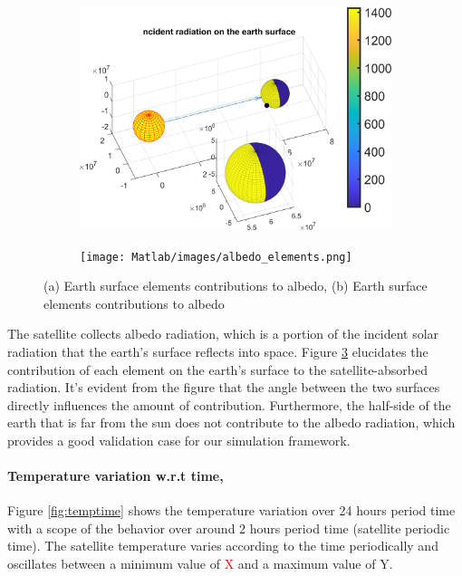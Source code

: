 \documentclass[11pt]{article}
\begin{document}
 
\begin{figure}[h]
    \centering
    \begin{subfigure}[b]{0.48\textwidth}
        \includegraphics[width=\textwidth]{Matlab/images/inc_sun_rad.png}
        \caption{}
        \label{fig:solar-rad-on-earth}
    \end{subfigure}
    \begin{subfigure}[b]{0.48\textwidth}
        \texttt{[image: Matlab/images/albedo\_elements.png]}
        \caption{}
        \label{fig:albedo}
    \end{subfigure}
    \caption{(a) Earth surface elements contributions to albedo, (b) Earth surface elements contributions to albedo}
\end{figure}


The satellite collects albedo radiation, which is a portion of the incident solar radiation that the earth's surface reflects into space. Figure \ref{fig:albedo} elucidates the contribution of each element on the earth's surface to the satellite-absorbed radiation. It's evident from the figure that the angle between the two surfaces directly influences the amount of contribution. Furthermore, the half-side of the earth that is far from the sun does not contribute to the albedo radiation, which provides a good validation case for our simulation framework.

 \newpage

\paragraph{Temperature variation w.r.t time,}
Figure \ref{fig:temptime} shows the temperature variation over 24 hours period time with a scope of the behavior over around 2 hours period time (satellite periodic time). The satellite temperature varies according to the time periodically and oscillates between a minimum value of \textcolor{red}{X} and a maximum value of Y.  
\end{document}
